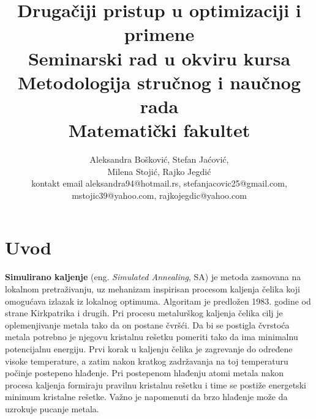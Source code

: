 \documentclass[a4paper]{article}
\begin{document}
\title{Drugačiji pristup u optimizaciji i primene\\ \small{Seminarski rad u okviru kursa\\Metodologija stručnog i naučnog rada\\ Matematički fakultet}}

\author{Aleksandra Bošković, Stefan Jaćović,\\Milena Stojić, Rajko Jegdić\\ kontakt email aleksandra94@hotmail.rs, stefanjacovic25@gmail.com,\\mstojic39@yahoo.com, rajkojegdic@yahoo.com}


\maketitle


\tableofcontents

\newpage

\section{Uvod}
\label{sec:uvod}

\textbf{Simulirano kaljenje} (eng. \textit{Simulated Annealing}, SA) je metoda zasnovana na lokalnom pretraživanju, uz mehanizam inspirisan procesom kaljenja čelika koji omogućava izlazak iz lokalnog optimuma. Algoritam je predložen 1983. godine od strane Kirkpatrika i drugih.
Pri procesu metalurškog kaljenja čelika cilj je oplemenjivanje metala tako da on postane čvršći. Da bi se postigla čvrstoća metala potrebno je njegovu kristalnu rešetku pomeriti tako da ima minimalnu potencijalnu energiju. Prvi korak u kaljenju čelika je zagrevanje do
određene visoke temperature, a zatim nakon kratkog zadržavanja na toj temperaturu počinje postepeno hlađenje. Pri postepenom hlađenju atomi metala nakon procesa kaljenja formiraju
pravilnu kristalnu rešetku i time se postiže energetski minimum kristalne rešetke. Važno je napomenuti da brzo hlađenje može da uzrokuje pucanje metala.
\end{document}
